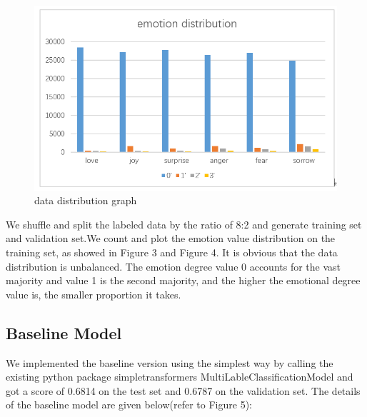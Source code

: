 \documentclass[12pt,twocolumn,letterpaper]{article}
\begin{document}
\begin{figure}
\begin{center}
\includegraphics[scale=0.3]{emotion distribution.png}
\end{center}
   \caption{data distribution graph}
\label{fig:short}
\end{figure}
We shuffle and split the labeled data  by the ratio of 8:2 and generate training set and validation set.We count and plot the emotion value distribution on the training set, as showed in Figure 3 and Figure 4. It is obvious that the data distribution is unbalanced. The emotion degree value 0 accounts for the vast majority and value 1 is the second majority, and the higher the emotional degree value is, the smaller proportion it takes. 



\subsection{Baseline Model}

We implemented the baseline version using the simplest way by calling the existing python package simpletransformers MultiLableClassificationModel and got a score of 0.6814 on the test set and 0.6787 on the validation set. The details of the baseline model are given below(refer to Figure 5):
\end{document}
